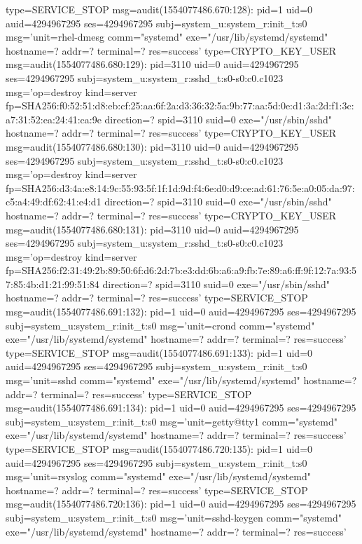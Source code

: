 \documentclass[]{report}
\newenvironment{Shaded}{}{}
\newcommand{\NormalTok}[1]{#1}
\begin{document}
\begin{Shaded}
\begin{Highlighting}[]
\NormalTok{type=SERVICE_STOP msg=audit(1554077486.670:128): pid=1 uid=0 auid=4294967295 ses=4294967295 subj=system_u:system_r:init_t:s0 msg='unit=rhel-dmesg comm="systemd" exe="/usr/lib/systemd/systemd" hostname=? addr=? terminal=? res=success'}
\NormalTok{type=CRYPTO_KEY_USER msg=audit(1554077486.680:129): pid=3110 uid=0 auid=4294967295 ses=4294967295 subj=system_u:system_r:sshd_t:s0-s0:c0.c1023 msg='op=destroy kind=server fp=SHA256:f0:52:51:d8:eb:cf:25:aa:6f:2a:d3:36:32:5a:9b:77:aa:5d:0e:d1:3a:2d:f1:3c:a7:31:52:ea:24:41:ca:9e direction=? spid=3110 suid=0  exe="/usr/sbin/sshd" hostname=? addr=? terminal=? res=success'}
\NormalTok{type=CRYPTO_KEY_USER msg=audit(1554077486.680:130): pid=3110 uid=0 auid=4294967295 ses=4294967295 subj=system_u:system_r:sshd_t:s0-s0:c0.c1023 msg='op=destroy kind=server fp=SHA256:d3:4a:e8:14:9c:55:93:5f:1f:1d:9d:f4:6e:d0:d9:ce:ad:61:76:5e:a0:05:da:97:c5:a4:49:df:62:41:e4:d1 direction=? spid=3110 suid=0  exe="/usr/sbin/sshd" hostname=? addr=? terminal=? res=success'}
\NormalTok{type=CRYPTO_KEY_USER msg=audit(1554077486.680:131): pid=3110 uid=0 auid=4294967295 ses=4294967295 subj=system_u:system_r:sshd_t:s0-s0:c0.c1023 msg='op=destroy kind=server fp=SHA256:f2:31:49:2b:89:50:6f:d6:2d:7b:e3:dd:6b:a6:a9:fb:7e:89:a6:ff:9f:12:7a:93:57:85:4b:d1:21:99:51:84 direction=? spid=3110 suid=0  exe="/usr/sbin/sshd" hostname=? addr=? terminal=? res=success'}
\NormalTok{type=SERVICE_STOP msg=audit(1554077486.691:132): pid=1 uid=0 auid=4294967295 ses=4294967295 subj=system_u:system_r:init_t:s0 msg='unit=crond comm="systemd" exe="/usr/lib/systemd/systemd" hostname=? addr=? terminal=? res=success'}
\NormalTok{type=SERVICE_STOP msg=audit(1554077486.691:133): pid=1 uid=0 auid=4294967295 ses=4294967295 subj=system_u:system_r:init_t:s0 msg='unit=sshd comm="systemd" exe="/usr/lib/systemd/systemd" hostname=? addr=? terminal=? res=success'}
\NormalTok{type=SERVICE_STOP msg=audit(1554077486.691:134): pid=1 uid=0 auid=4294967295 ses=4294967295 subj=system_u:system_r:init_t:s0 msg='unit=getty@tty1 comm="systemd" exe="/usr/lib/systemd/systemd" hostname=? addr=? terminal=? res=success'}
\NormalTok{type=SERVICE_STOP msg=audit(1554077486.720:135): pid=1 uid=0 auid=4294967295 ses=4294967295 subj=system_u:system_r:init_t:s0 msg='unit=rsyslog comm="systemd" exe="/usr/lib/systemd/systemd" hostname=? addr=? terminal=? res=success'}
\NormalTok{type=SERVICE_STOP msg=audit(1554077486.720:136): pid=1 uid=0 auid=4294967295 ses=4294967295 subj=system_u:system_r:init_t:s0 msg='unit=sshd-keygen comm="systemd" exe="/usr/lib/systemd/systemd" hostname=? addr=? terminal=? res=success'}

\end{Highlighting}
\end{Shaded}
\end{document}
